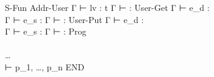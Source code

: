 {{    }
    {S-Fun}{ 
               { }
               {}
    }
    {Addr-User}{ 
               { Γ ⊢ lv : t }
               { Γ ⊢  :  }
    }
    {User-Get}{ 
                  { Γ ⊢ e_d : 
                 \\ Γ ⊢ e_s : 
                  }
                  { Γ ⊢  : \tInt }
    }
    {User-Put}{ 
                  { Γ ⊢ e_d : 
                 \\ Γ ⊢ e_s : 
                  }
                  { Γ ⊢  : \tInt }
    }
    {Prog}{ 
                { 
               \\ 
               \\ …
               \\ 
                }
                { ⊢ p_1, …, p_n}
    }
    {END}
}

